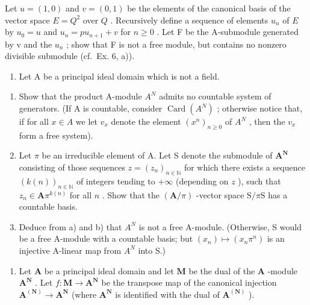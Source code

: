 Let \(u = (1,0)\) and \(v = (0,1)\) be the elements of the canonical basis of the vector space \(E = Q^2\) over \(Q\) . Recursively define a sequence of elements \(u_n\) of \(E\) by \(u_0 = u\) and \(u_{n}=pu_{n+1}+v\) for \(n\geqslant0\) . Let F be the A-submodule generated by v and the \(u_{n}\) ; show that F is not a free module, but contains no nonzero divisible submodule (cf.~Ex. 6, a)).

\begin{enumerate}
\def\labelenumi{\arabic{enumi})}
\setcounter{enumi}{7}
\tightlist
\item
  Let A be a principal ideal domain which is not a field.
\end{enumerate}

\begin{enumerate}
\def\labelenumi{\alph{enumi})}
\item
  Show that the product A-module \(A^{N}\) admits no countable system of generators. (If A is countable, consider \(\operatorname{Card}(A^{N})\) ; otherwise notice that, if for all \(x \in A\) we let \(v_{x}\) denote the element \((x^{n})_{n \geq 0}\) of \(A^{N}\) , then the \(v_{x}\) form a free system).
\item
  Let \(\pi\) be an irreducible element of A. Let S denote the submodule of \(\mathbf{A}^{\mathbf{N}}\) consisting of those sequences \(z = (z_{n})_{n\in \mathbb{N}}\) for which there exists a sequence \((k(n))_{n\in \mathbb{N}}\) of integers tending to \(+\infty\) (depending on \(z\) ), such that \(z_{n}\in \mathbf{A}\pi^{k(n)}\) for all \(n\) . Show that the \((\mathbf{A} / \pi)\) -vector space \(\mathrm{S} / \pi \mathrm{S}\) has a countable basis.
\item
  Deduce from a) and b) that \(A^{N}\) is not a free A-module. (Otherwise, S would be a free A-module with a countable basis; but \((x_{n})\mapsto(x_{n}\pi^{n})\) is an injective A-linear map from \(A^{N}\) into S.)
\end{enumerate}

\begin{enumerate}
\def\labelenumi{\arabic{enumi})}
\setcounter{enumi}{8}
\tightlist
\item
  Let \(\mathbf{A}\) be a principal ideal domain and let \(\mathbf{M}\) be the dual of the \(\mathbf{A}\) -module \(\mathbf{A}^{\mathbf{N}}\) . Let \(f: \mathbf{M} \to \mathbf{A}^{\mathbf{N}}\) be the transpose map of the canonical injection \(\mathbf{A}^{(\mathbf{N})} \to \mathbf{A}^{\mathbf{N}}\) (where \(\mathbf{A}^{\mathbf{N}}\) is identified with the dual of \(\mathbf{A}^{(\mathbf{N})}\) ).
\end{enumerate}

